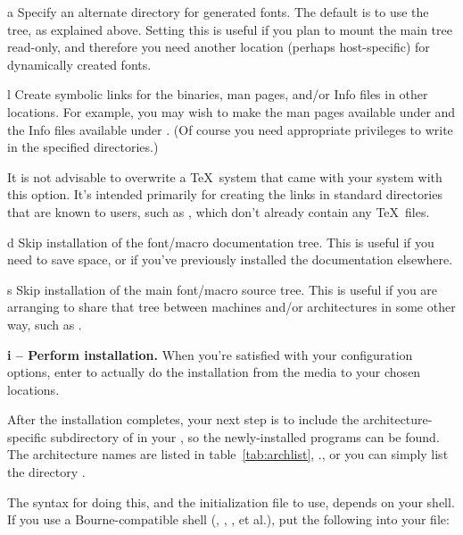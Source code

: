 \documentclass{article}
\begin{document}
\begin{ttdescription}
\item [a] Specify an alternate directory for generated fonts.
The default is to use the  tree, as explained above.
Setting this is useful if you plan to mount the main tree read-only, and
therefore you need another location (perhaps host-specific) for
dynamically created fonts.

\item [l] Create symbolic links for the binaries, man pages,
and\slash or  Info files in other locations.  For example, you may
wish to make the man pages available under  and
the Info files available under .  (Of course
you need appropriate privileges to write in the specified directories.)

It is not advisable to overwrite a \TeX\ system that came with your
system with this option.  It's intended primarily for creating the links
in standard directories that are known to users, such as
, which don't already contain any \TeX\ files.

\item [d] Skip installation of the font/macro documentation tree.
This is useful if you need to save space, or if you've previously
installed the documentation elsewhere.

\item [s] Skip installation of the main font/macro source
tree.  This is useful if you are arranging to share that tree between
machines and\slash or architectures in some other way, such as .

\end{ttdescription}

\textbf{i -- Perform installation.}  When you're satisfied with your
configuration options, enter  to actually do the installation
from the media to your chosen locations.

After the installation completes, your next step is to include the
architecture-specific subdirectory of  in your
, so the newly-installed programs can be found.  The
architecture names are listed in table~\ref{tab:archlist},
\p.\pageref{tab:archlist}, or you can simply list the directory
.

The syntax for doing this, and the initialization file to use, depends
on your shell.  If you use a Bourne-compatible shell (,
, , et al.), put the following into your
 file:
\end{document}
